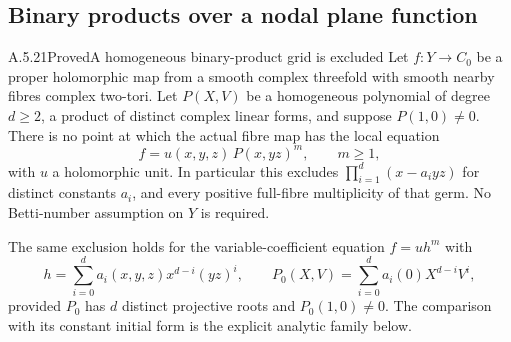 \subsection{Binary products over a nodal plane function}

\begin{statement}{A.5.21}{Proved}{A homogeneous binary-product grid is excluded}
Let $f:Y\to C_0$ be a proper holomorphic map from a smooth
complex threefold with smooth nearby fibres complex
two-tori. Let $P(X,V)$ be a homogeneous polynomial of
degree $d\ge2$, a product of distinct complex linear
forms, and suppose $P(1,0)\ne0$.
There is no point at which the actual fibre map has
the local equation
\[
             f=u(x,y,z)\,P(x,yz)^m,
             \qquad m\ge1,                         \tag{A.BP.1}
\]
with $u$ a holomorphic unit. In particular this excludes
$\prod_{i=1}^d(x-a_i yz)$ for distinct constants $a_i$,
and every positive full-fibre multiplicity of that germ.
No Betti-number assumption on $Y$ is required.

The same exclusion holds for the variable-coefficient
equation $f=u h^m$ with
\[
 h=\sum_{i=0}^d a_i(x,y,z)x^{d-i}(yz)^i,
 \qquad P_0(X,V)=\sum_{i=0}^d a_i(0)X^{d-i}V^i,
                                                        \tag{A.BP.4}
\]
provided $P_0$ has $d$ distinct projective roots and
$P_0(1,0)\ne0$. The comparison with its constant
initial form is the explicit analytic family below.
\end{statement}
